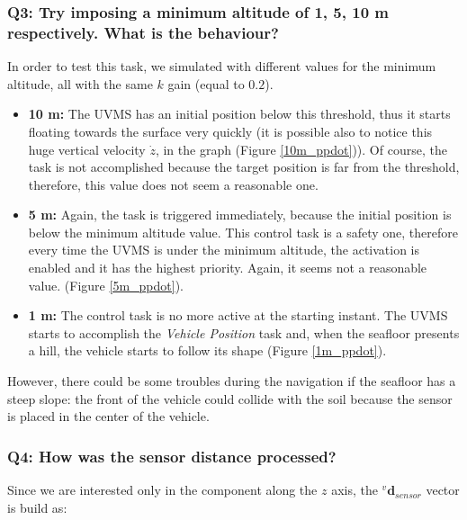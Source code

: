 \documentclass{article}
\begin{document}

\subsubsection{Q3: Try imposing a minimum altitude of 1, 5, 10 m respectively. What is the behaviour?}
In order to test this task, we simulated with different values for the minimum altitude, all with the same $k$ gain (equal to $0.2$).

\begin{itemize}
    \item \textbf{10 m:} The UVMS has an initial position below this threshold, thus it starts floating towards the surface very quickly (it is possible also to notice this huge vertical velocity $\dot{z}$, in the graph (Figure \ref{10m_ppdot})). 
    Of course, the task is not accomplished because the target position is far from the threshold, therefore, this value does not seem a reasonable one. %
    \item \textbf{5 m:} Again, the task is triggered immediately, because the initial position is below the minimum altitude value. This control task is a safety one, therefore every time the UVMS is under the minimum altitude, the activation is enabled and it has the highest priority. 
    Again, it seems not a reasonable value. (Figure \ref{5m_ppdot}).
    \item \textbf{1 m:} The control task is no more active at the starting instant. The UVMS starts to accomplish the \textit{Vehicle Position} task and, when the seafloor presents a hill, the vehicle starts to follow its shape (Figure \ref{1m_ppdot}). 
\end{itemize}
However, there could be some troubles during the navigation if the seafloor has a steep slope: the front of the vehicle could collide with the soil because the sensor is placed in the center of the vehicle.


\subsubsection{Q4: How was the sensor distance processed?}
 
 Since we are interested only in the component along the $z$ axis, the $^{v}\boldsymbol{d}_{sensor}$ vector is build as:
 
\end{document}
